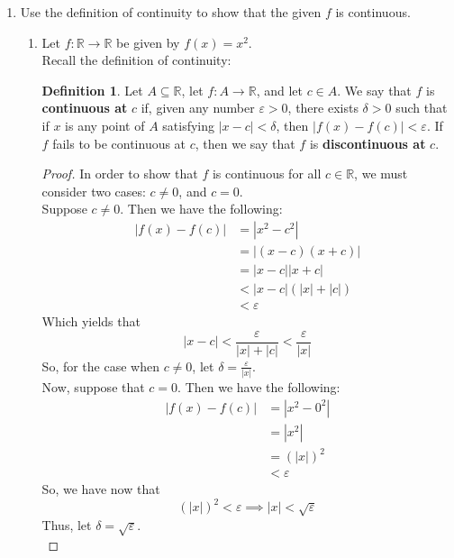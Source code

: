 \documentclass[12pt,letterpaper]{article}
\newcommand{\R}{\mathbb{R}}
\theoremstyle{case}
\theoremstyle{definition}
\newtheorem{definition}{Definition}[section]
\begin{document}
\begin{enumerate}
\begin{enumerate}
\begin{proof}
				$\therefore$ We have that $f(x)=0$ for all $x \in \R$.
			\end{proof}
		\end{enumerate}
		\item Use the definition of continuity to show that the given $f$ is continuous.
		\begin{enumerate}
			\item Let $f:\R \to \R$ be given by $f(x)=x^2$.\\
			
			Recall the definition of continuity:
			\theoremstyle{definition}
			\begin{definition}
				Let $A \subseteq \R$, let $f:A \to \R$, and let $c \in A$. We say that $f$ is \textbf{continuous at} $c$ if, given any number $\varepsilon > 0$, there exists $\delta >0$ such that if $x$ is any point of $A$ satisfying $|x-c|<\delta$, then $|f(x)-f(c)|<\varepsilon$. If $f$ fails to be continuous at $c$, then we say that $f$ is \textbf{discontinuous at} $c$.
			\end{definition}
			
			\begin{proof}
				In order to show that $f$ is continuous for all $c \in \R$, we must consider two cases: $c\neq 0$, and $c=0$.\\
				
				Suppose $c \neq 0$. Then we have the following:
				\begin{align*}
					|f(x)-f(c)| &= |x^2 - c^2| \\
					&=|(x-c)(x+c)| \\
					&=|x-c||x+c| \\
					&< |x-c|(|x|+|c|) \\
					&<\varepsilon
				\end{align*}
				Which yields that
				\[|x-c|<\frac{\varepsilon}{|x|+|c|}< \frac{\varepsilon}{|x|}\]
				So, for the case when $c \neq 0$, let $\delta=\frac{\varepsilon}{|x|}$.\\
				
				Now, suppose that $c=0$. Then we have the following:
				\begin{align*}
					|f(x)-f(c)| &= |x^2-0^2| \\
					&= |x^2| \\
					&=(|x|)^2 \\
					&< \varepsilon
				\end{align*}
				So, we have now that
				\[(|x|)^2 < \varepsilon \implies |x|<\sqrt{\varepsilon}\]
				Thus, let $\delta=\sqrt{\varepsilon}$.\\
				

\end{proof}
\end{enumerate}
\end{enumerate}
\end{document}
